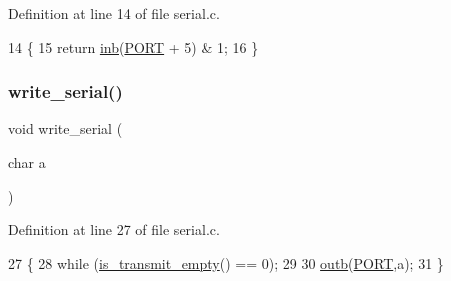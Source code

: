 Definition at line 14 of file serial.\+c.


\begin{DoxyCode}
14                       \{
15    \textcolor{keywordflow}{return} \hyperlink{a00158_a0223c8898dfec29069879dc51076e28a_a0223c8898dfec29069879dc51076e28a}{inb}(\hyperlink{a00050_a614217d263be1fb1a5f76e2ff7be19a2_a614217d263be1fb1a5f76e2ff7be19a2}{PORT} + 5) & 1;
16 \}
\end{DoxyCode}
\mbox{\label{a00053_aac3c84e21fffc4696d8969ca6955bfc8_aac3c84e21fffc4696d8969ca6955bfc8}} 
\subsubsection{\texorpdfstring{write\+\_\+serial()}{write\_serial()}}
{\footnotesize\ttfamily void write\+\_\+serial (\begin{DoxyParamCaption}\item[{char}]{a }\end{DoxyParamCaption})}



Definition at line 27 of file serial.\+c.


\begin{DoxyCode}
27                           \{
28    \textcolor{keywordflow}{while} (\hyperlink{a00050_a01fe5504f7b8f4eee1545737495bae76_a01fe5504f7b8f4eee1545737495bae76}{is\_transmit\_empty}() == 0);
29  
30    \hyperlink{a00158_aa37f5841c54156a4b14fc0d6f626b44f_aa37f5841c54156a4b14fc0d6f626b44f}{outb}(\hyperlink{a00050_a614217d263be1fb1a5f76e2ff7be19a2_a614217d263be1fb1a5f76e2ff7be19a2}{PORT},a);
31 \}
\end{DoxyCode}
